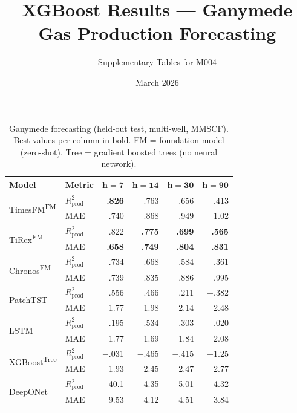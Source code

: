 \documentclass[10pt]{article}
\title{XGBoost Results --- Ganymede Gas Production Forecasting}
\author{Supplementary Tables for M004}
\date{March 2026}
\begin{document}
\maketitle

\begin{table}[ht]
\centering
\caption{Ganymede forecasting (held-out test, multi-well, MMSCF). Best values per column in bold. FM = foundation model (zero-shot). Tree = gradient boosted trees (no neural network).}
\label{tab:ganymede_with_xgboost}
\small
\setlength{\tabcolsep}{2.5pt}
\begin{tabular}{@{}ll rrrr @{}}
\toprule
\textbf{Model} & \textbf{Metric} & $\boldsymbol{h{=}7}$ & $\boldsymbol{h{=}14}$ & $\boldsymbol{h{=}30}$ & $\boldsymbol{h{=}90}$ \\
\midrule
\multirow{2}{*}{TimesFM\textsuperscript{FM}}
 & $R^2_\text{prod}$ & \textbf{.826} & .763 & .656 & .413 \\
 & MAE               & .740 & .868 & .949 & 1.02 \\
\midrule
\multirow{2}{*}{TiRex\textsuperscript{FM}}
 & $R^2_\text{prod}$ & .822 & \textbf{.775} & \textbf{.699} & \textbf{.565} \\
 & MAE               & \textbf{.658} & \textbf{.749} & \textbf{.804} & \textbf{.831} \\
\midrule
\multirow{2}{*}{Chronos\textsuperscript{FM}}
 & $R^2_\text{prod}$ & .734 & .668 & .584 & .361 \\
 & MAE               & .739 & .835 & .886 & .995 \\
\midrule
\multirow{2}{*}{PatchTST}
 & $R^2_\text{prod}$ & .556 & .466 & .211 & $-$.382 \\
 & MAE               & 1.77 & 1.98 & 2.14 & 2.48 \\
\midrule
\multirow{2}{*}{LSTM}
 & $R^2_\text{prod}$ & .195 & .534 & .303 & .020 \\
 & MAE               & 1.77 & 1.69 & 1.84 & 2.08 \\
\midrule
\multirow{2}{*}{XGBoost\textsuperscript{Tree}}
 & $R^2_\text{prod}$ & $-$.031 & $-$.465 & $-$.415 & $-$1.25 \\
 & MAE               & 1.93 & 2.45 & 2.47 & 2.77 \\
\midrule
\multirow{2}{*}{DeepONet}
 & $R^2_\text{prod}$ & $-$40.1 & $-$4.35 & $-$5.01 & $-$4.32 \\
 & MAE               & 9.53 & 4.12 & 4.51 & 3.84 \\
\bottomrule
\end{tabular}
\end{table}
\end{document}

